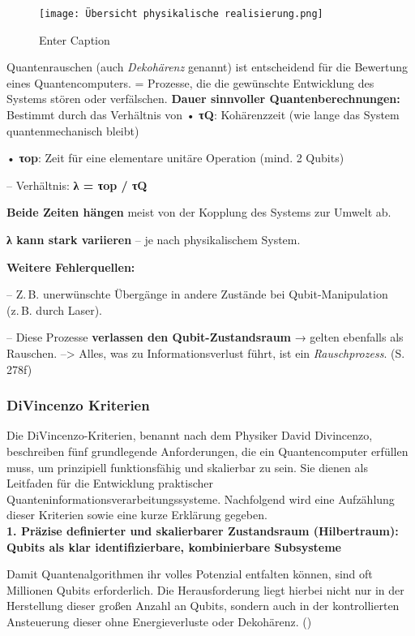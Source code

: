 \begin{figure}
    \centering
    \texttt{[image: Übersicht physikalische realisierung.png]}
    \caption{Enter Caption}
    \label{fig:enter-label}
\end{figure}
\cite{nielsen_michael_a_and_isaac_l_chuang_quantum_2010}

Quantenrauschen (auch \textit{Dekohärenz} genannt) ist entscheidend für die Bewertung eines Quantencomputers.
= Prozesse, die die gewünschte Entwicklung des Systems stören oder verfälschen.
\textbf{Dauer sinnvoller Quantenberechnungen:}
 Bestimmt durch das Verhältnis von
 • \textbf{τQ}: Kohärenzzeit (wie lange das System quantenmechanisch bleibt)

 • \textbf{τop}: Zeit für eine elementare unitäre Operation (mind. 2 Qubits)

 – Verhältnis: \textbf{λ = τop / τQ}
    \item \textbf{Beide Zeiten hängen} meist von der Kopplung des Systems zur Umwelt ab.
    \item \textbf{λ kann stark variieren} – je nach physikalischem System.
    \item \textbf{Weitere Fehlerquellen:}

 – Z. B. unerwünschte Übergänge in andere Zustände bei Qubit-Manipulation (z. B. durch Laser).

 – Diese Prozesse \textbf{verlassen den Qubit-Zustandsraum} → gelten ebenfalls als Rauschen.
--> Alles, was zu Informationsverlust führt, ist ein \textit{Rauschprozess}. (S. 278f)


\subsubsection{DiVincenzo Kriterien}

Die DiVincenzo-Kriterien, benannt nach dem Physiker David Divincenzo, beschreiben fünf grundlegende Anforderungen, die ein Quantencomputer erfüllen muss, um prinzipiell funktionsfähig und skalierbar zu sein. Sie dienen als Leitfaden für die Entwicklung praktischer Quanteninformationsverarbeitungssysteme. Nachfolgend wird eine Aufzählung dieser Kriterien sowie eine kurze Erklärung gegeben. \\

\textbf{1. Präzise definierter und skalierbarer Zustandsraum (Hilbertraum): Qubits als klar identifizierbare, kombinierbare Subsysteme} 

Damit Quantenalgorithmen ihr volles Potenzial entfalten können, sind oft Millionen Qubits erforderlich. Die Herausforderung liegt hierbei nicht nur in der Herstellung dieser großen Anzahl an Qubits, sondern auch in der kontrollierten Ansteuerung dieser ohne Energieverluste oder Dekohärenz. 
(\cite{lapierre_introduction_2021})

